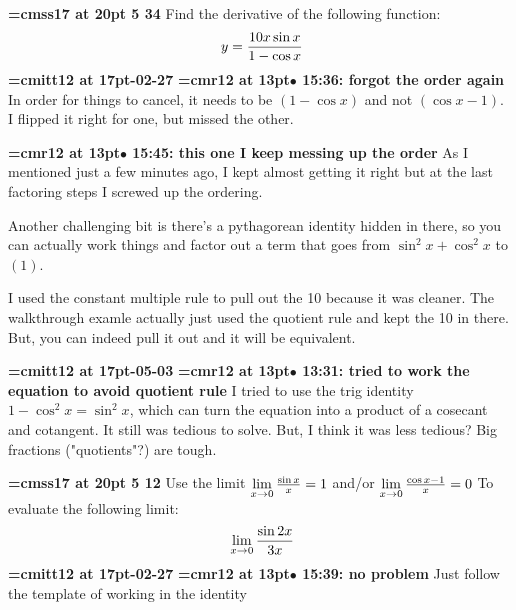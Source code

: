 {\medskip\noindent\bf\font\titlefont=cmss17 at 20pt 5 34}\medskip
Find the derivative of the following function:
$$\
y = { 10x \sin x \over 1 - \cos x }
$$
{\medskip\noindent\bf\font\titlefont=cmitt12 at 17pt-02-27}\medskip
{\smallskip\noindent\bf\font\titlefont=cmr12 at 13pt\titlefont $\bullet$ 15:36: forgot the order again}\smallskip
In order for things to cancel, it needs to be $(1 - \cos x)$ and not $(\cos x - 1)$. I flipped it right for one, but missed the other.
\par

{\smallskip\noindent\bf\font\titlefont=cmr12 at 13pt\titlefont $\bullet$ 15:45: this one I keep messing up the order}\smallskip
As I mentioned just a few minutes ago, I kept almost getting it right but at the last factoring steps I screwed up the ordering.
\par

Another challenging bit is there's a pythagorean identity hidden in there, so you can actually work things and factor out a term that  goes from $\sin^2 x + \cos^2 x$ to $(1)$.
\par

I used the constant multiple rule to pull out the 10 because it was cleaner. The walkthrough examle actually just used the quotient rule and kept the 10 in there. But, you can indeed pull it out and it will be equivalent.
\par

{\medskip\noindent\bf\font\titlefont=cmitt12 at 17pt-05-03}\medskip
{\smallskip\noindent\bf\font\titlefont=cmr12 at 13pt\titlefont $\bullet$ 13:31: tried to work the equation to avoid quotient rule}\smallskip
I tried to use the trig identity $1-\cos^2x = \sin^2 x$, which can turn the equation into a product of a cosecant and cotangent. It still was tedious to solve. But, I think it was less tedious? Big fractions ("quotients"?) are tough.
\par

{\medskip\noindent\bf\font\titlefont=cmss17 at 20pt 5 12}\medskip
Use the limit
$\lim\limits_{x \to 0} {\sin x \over x} = 1$
and/or
$\lim\limits_{x \to 0} {\cos x - 1 \over x} = 0$
To evaluate the following limit:
$$\
\lim_{x \to 0} {\sin 2x \over 3x}
$$
{\medskip\noindent\bf\font\titlefont=cmitt12 at 17pt-02-27}\medskip
{\smallskip\noindent\bf\font\titlefont=cmr12 at 13pt\titlefont $\bullet$ 15:39: no problem}\smallskip
Just follow the template of working in the identity
\par

